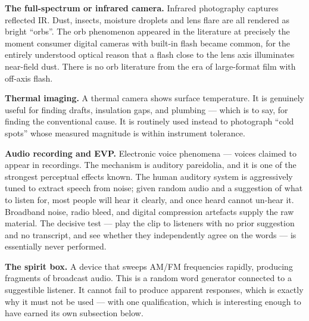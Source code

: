 \textbf{The full-spectrum or infrared camera.} Infrared photography captures reflected IR.
Dust, insects, moisture droplets and lens flare are all rendered as bright ``orbs''. The orb
phenomenon appeared in the literature at precisely the moment consumer digital cameras with
built-in flash became common, for the entirely understood optical reason that a flash close to
the lens axis illuminates near-field dust. There is no orb literature from the era of
large-format film with off-axis flash.

\textbf{Thermal imaging.} A thermal camera shows surface temperature. It is genuinely useful
for finding drafts, insulation gaps, and plumbing --- which is to say, for finding the
conventional cause. It is routinely used instead to photograph ``cold spots'' whose measured
magnitude is within instrument tolerance.

\textbf{Audio recording and EVP.} Electronic voice phenomena --- voices claimed to appear in
recordings. The mechanism is auditory pareidolia, and it is one of the strongest perceptual
effects known. The human auditory system is aggressively tuned to extract speech from noise;
given random audio and a suggestion of what to listen for, most people will hear it clearly,
and once heard cannot un-hear it. Broadband noise, radio bleed, and digital compression
artefacts supply the raw material. The decisive test --- play the clip to listeners with no
prior suggestion and no transcript, and see whether they independently agree on the words ---
is essentially never performed.

\textbf{The spirit box.} A device that sweeps AM/FM frequencies rapidly, producing fragments
of broadcast audio. This is a random word generator connected to a suggestible listener. It
cannot fail to produce apparent responses, which is exactly why it must not be used --- with one
qualification, which is interesting enough to have earned its own subsection below.

